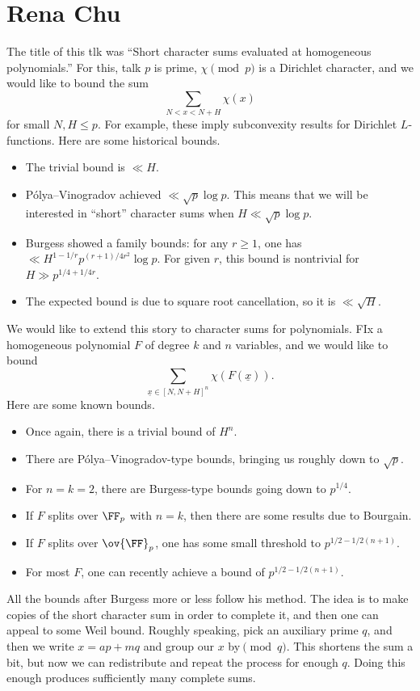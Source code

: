 \documentclass{article}
\begin{document}
\section{Rena Chu}
The title of this tlk was ``Short character sums evaluated at homogeneous polynomials.'' For this, talk $p$ is prime, $\chi\pmod p$ is a Dirichlet character, and we would like to bound the sum
\[\sum_{N<x<N+H}\chi(x)\]
for small $N,H\le p$. For example, these imply subconvexity results for Dirichlet $L$-functions. Here are some historical bounds.
\begin{itemize}
	\item The trivial bound is $\ll H$.
	\item P\'olya--Vinogradov achieved $\ll\sqrt p\log p$. This means that we will be interested in ``short'' character sums when $H\ll\sqrt p\log p$.
	\item Burgess showed a family bounds: for any $r\ge1$, one has $\ll H^{1-1/r}p^{(r+1)/4r^2}\log p$. For given $r$, this bound is nontrivial for $H\gg p^{1/4+1/4r}$.
	\item The expected bound is due to square root cancellation, so it is $\ll\sqrt H$.
\end{itemize}
We would like to extend this story to character sums for polynomials. FIx a homogeneous polynomial $F$ of degree $k$ and $n$ variables, and we would like to bound
\[\sum_{\underline x\in[N,N+H]^n}\chi(F(\underline x)).\]
Here are some known bounds.
\begin{itemize}
	\item Once again, there is a trivial bound of $H^n$.
	\item There are P\'olya--Vinogradov-type bounds, bringing us roughly down to $\sqrt p$.
	\item For $n=k=2$, there are Burgess-type bounds going down to $p^{1/4}$.
	\item If $F$ splits over $\FF_p$ with $n=k$, then there are some results due to Bourgain.
	\item If $F$ splits over $\ov{\FF}_p$, one has some small threshold to $p^{1/2-1/2(n+1)}$.
	\item For most $F$, one can recently achieve a bound of $p^{1/2-1/2(n+1)}$.
\end{itemize}
All the bounds after Burgess more or less follow his method. The idea is to make copies of the short character sum in order to complete it, and then one can appeal to some Weil bound. Roughly speaking, pick an auxiliary prime $q$, and then we write $x=ap+mq$ and group our $x$ by$\pmod q$. This shortens the sum a bit, but now we can redistribute and repeat the process for enough $q$. Doing this enough produces sufficiently many complete sums.
\end{document}
